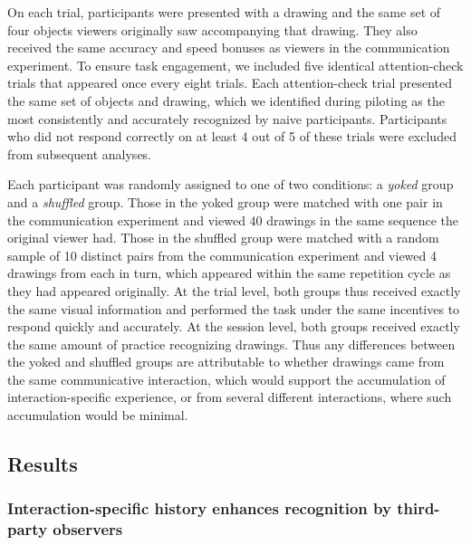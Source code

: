 \documentclass[10pt,letterpaper]{article}
\begin{document}
On each trial, participants were presented with a drawing and the same set of four objects viewers originally saw accompanying that drawing.
They also received the same accuracy and speed bonuses as viewers in the communication experiment. 
To ensure task engagement, we included five identical attention-check trials that appeared once every eight trials.
Each attention-check trial presented the same set of objects and drawing, which we identified during piloting as the most consistently and accurately recognized by naive participants.
Participants who did not respond correctly on at least 4 out of 5 of these trials were excluded from subsequent analyses.

Each participant was randomly assigned to one of two conditions: a \textit{yoked} group and a \textit{shuffled} group.
Those in the yoked group were matched with one pair in the communication experiment and viewed 40 drawings in the same sequence the original viewer had.
Those in the shuffled group were matched with a random sample of 10 distinct pairs from the communication experiment and viewed 4 drawings from each in turn, which appeared within the same repetition cycle as they had appeared originally.
At the trial level, both groups thus received exactly the same visual information and performed the task under the same incentives to respond quickly and accurately.
At the session level, both groups received exactly the same amount of practice recognizing drawings.
Thus any differences between the yoked and shuffled groups are attributable to whether drawings came from the same communicative interaction, which would support the accumulation of interaction-specific experience, or from several different interactions, where such accumulation would be minimal.

\subsection{Results}

\subsubsection{Interaction-specific history enhances recognition by third-party observers}

\end{document}
